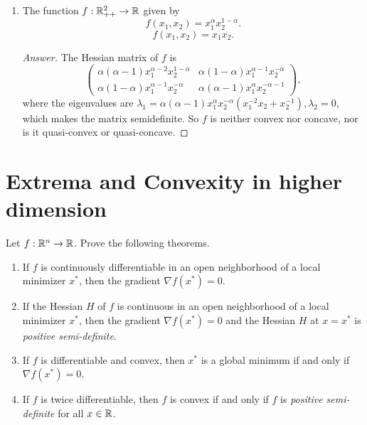 \begin{enumerate}
	\[ f(x_1,x_2)=\frac{x_1^2}{x_2}. \]
	\begin{proof}[Answer]
	The Hessian matrix of \(f\) is
	\[ \begin{pmatrix} \frac{2}{x_2} & -\frac{2x_1}{x_2^2} \\ -\frac{2x_1}{x_2^2} & \frac{2x_1^2}{x_2^3} \end{pmatrix}, \]
	which is negative semidefinite.
	So \(f\) is neither convex nor concave, nor is it quasi-convex or quasi-concave.
	\end{proof}
	\item The function \(f: \mathbb{R}_{++}^2 \to \mathbb{R}\) given by
	\[ f(x_1,x_2)=x_1^\alpha x_2^{1-\alpha}. \]
	\[ f(x_1,x_2)=x_1 x_2. \]
	\begin{proof}[Answer]
	The Hessian matrix of \(f\) is
	\[ \begin{pmatrix} \alpha(\alpha-1)x_1^{\alpha-2}x_2^{1-\alpha}  & \alpha(1-\alpha)x_1^{\alpha-1}x_2^{-\alpha} \\ \alpha(1-\alpha)x_1^{\alpha-1}x_2^{-\alpha} & \alpha(\alpha-1)x_1^{\alpha}x_2^{-\alpha-1} \end{pmatrix}, \]
	where the eigenvalues are \(\lambda_1=\alpha(\alpha-1)x_1^{\alpha}x_2^{-\alpha}\left(x_1^{-2}x_2+x_2^{-1}\right),\lambda_2=0\), which makes the matrix semidefinite.
	So \(f\) is neither convex nor concave, nor is it quasi-convex or quasi-concave.
	\end{proof}
\end{enumerate}


\section{Extrema and Convexity in higher dimension}
Let \(f: \mathbb{R}^n \to \mathbb{R}\). Prove the following theorems.
\begin{enumerate}
	\item If \(f\) is continuously differentiable in an open neighborhood of a local minimizer \(x^*\), then the gradient \(\nabla f(x^ *) = 0\).
	\item If the Hessian \(H\) of \(f\) is continuous in an open neighborhood of a local minimizer \(x^*\), then the gradient \(\nabla f(x^ *) = 0\) and the Hessian \(H\) at \(x=x^*\) is \emph{positive semi-definite}.
	\item If \(f\) is differentiable and convex, then \(x^*\) is a global minimum if and only if \(\nabla f(x^*) = 0\).
	\item If \(f\) is twice differentiable, then \(f\) is convex if and only if \(f\) is \emph{positive semi-definite} for all \(x \in \mathbb{R}\).
\end{enumerate}


